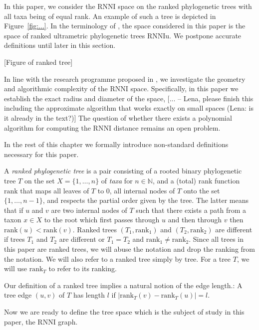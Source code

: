 \documentclass{amsart}
\newcommand{\rank}{\mathrm{rank}}
\newcommand{\rnni}{\mathrm{RNNI}}
\newcommand{\rnniu}{\mathrm{RNNIu}}
\begin{document}
In this paper, we consider the $\rnni$ space on the ranked phylogenetic trees with all taxa being of equal rank.
An example of such a tree is depicted in Figure~\ref{fig:...}.
In the terminology of \autocite{Gavryushkin2018-ol}, the space considered in this paper is the space of ranked ultrametric phylogenetic trees $\rnniu$.
We postpone accurate definitions until later in this section.

[Figure of ranked tree]

In line with the research programme proposed in \autocite{Gavryushkin2018-ol}, we investigate the geometry and algorithmic complexity of the $\rnni$ space.
Specifically, in this paper we establish the exact radius and diameter of the space, [... -- Lena, please finish this including the approximate algorithm that works exactly on small spaces (Lena: is it already in the text?)]
The question of whether there exists a polynomial algorithm for computing the $\rnni$ distance remains an open problem.

In the rest of this chapter we formally introduce non-standard definitions necessary for this paper.

A \emph{ranked phylogenetic tree} is a pair consisting of a rooted binary phylogenetic tree $T$ on the set $X = \{1, \ldots, n\}$ of \emph{taxa} for $n \in \mathbb N$, and a (total) rank function $\rank$ that maps all leaves of $T$ to $0$, all internal nodes of $T$ onto the set $\{1, \ldots, n-1\}$, and respects the partial order given by the tree.
The latter means that if $u$ and $v$ are two internal nodes of $T$ such that there exists a path from a taxon $x \in X$ to the root which first passes through $u$ and then through $v$ then $\rank(u) < \rank(v)$.
Ranked trees $(T_1, \rank_1)$ and $(T_2, \rank_2)$ are different if trees $T_1$ and $T_2$ are different or $T_1 = T_2$ and $\rank_1 \neq \rank_2$.
Since all trees in this paper are ranked trees, we will abuse the notation and drop the ranking from the notation.
We will also refer to a ranked tree simply by tree.
For a tree $T$, we will use $\rank_T$ to refer to its ranking.

Our definition of a ranked tree implies a natural notion of the edge length.:
A tree edge $(u,v)$ of $T$ has length $l$ if $|\rank_T(v) - \rank_T(u)| = l$.

Now we are ready to define the tree space which is the subject of study in this paper, the $\rnni$ graph.
\end{document}
